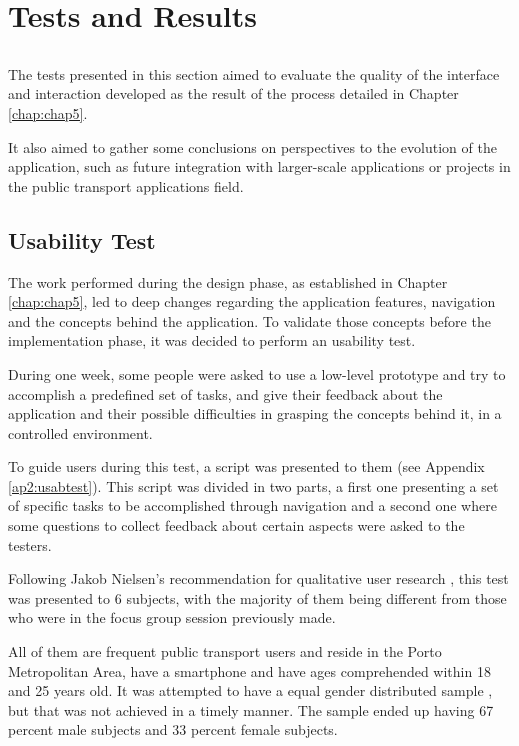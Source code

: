\chapter{Tests and Results} \label{chap:chap6}

\section*{}

The tests presented in this section aimed to evaluate the quality of the interface and interaction developed as the result of the process detailed in Chapter \ref{chap:chap5}. 

It also aimed to gather some conclusions on perspectives to the evolution of the application, such as future integration with larger-scale applications or projects in the public transport applications field.

\section{Usability Test}

The work performed during the design phase, as established in Chapter \ref{chap:chap5}, led to deep changes regarding the application features, navigation and the concepts behind the application. To validate those concepts before the implementation phase, it was decided to perform an usability test.


During one week, some people were asked to use a low-level prototype and try to accomplish a predefined set of tasks, and give their feedback about the application and their possible difficulties in grasping the concepts behind it, in a controlled environment.

To guide users during this test, a script was presented to them (see Appendix \ref{ap2:usabtest}). This script was divided in two parts, a first one presenting a set of specific tasks to be accomplished through navigation and a second one where some questions to collect feedback about certain aspects were asked to the testers.

Following Jakob Nielsen's recommendation for qualitative user research \cite{kn:MobileUsab}, this test was presented to 6 subjects, with the majority of them being different from those who were in the focus group session previously made.

All of them are frequent public transport users and reside in the Porto Metropolitan Area, have a smartphone and have ages comprehended within 18 and 25 years old. It was attempted to have a equal gender distributed sample , but that was not achieved in a timely manner. The sample ended up having 67 percent male subjects and 33 percent female subjects.

